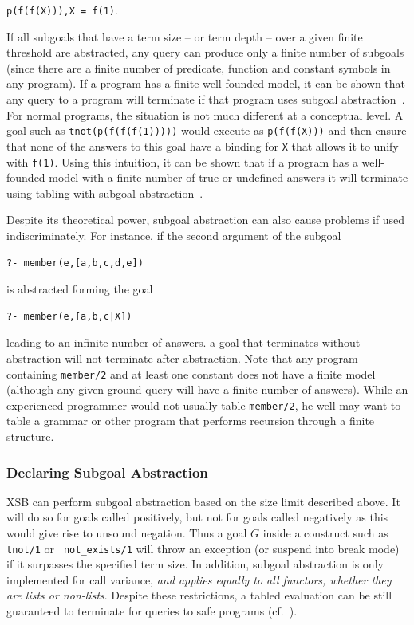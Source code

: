 {\tt p(f(f(X))),X = f(1)}.  

\noindent
If all subgoals that have a term size -- or term depth -- over a given
finite threshold are abstracted, any query can produce only a finite
number of subgoals (since there are a finite number of predicate,
function and constant symbols in any program). If a program has a
finite well-founded model, it can be shown that any query to a program
will terminate if that program uses subgoal abstraction~\cite{RigS14}.
%
For normal programs, the situation is not much different at a
conceptual level.  A goal such as {\tt tnot(p(f(f(f(1)))))} would
execute as {\tt p(f(f(X)))} and then ensure that none of the answers
to this goal have a binding for {\tt X} that allows it to unify with
{\tt f(1)}.  Using this intuition, it can be shown that if a program
has a well-founded model with a finite number of true or undefined
answers it will terminate using tabling with subgoal
abstraction~\cite{RigS13,RigS14}.

Despite its theoretical power, subgoal abstraction can also cause
problems if used indiscriminately.  For instance, if the second
argument of the subgoal
%
\begin{verbatim}
?- member(e,[a,b,c,d,e])
\end{verbatim}
%
is abstracted forming the goal
%
\begin{verbatim}
?- member(e,[a,b,c|X])
\end{verbatim}
%
leading to an infinite number of answers.  a goal that terminates
without abstraction will not terminate after abstraction.  Note that
any program containing {\tt member/2} and at least one constant does
not have a finite model (although any given ground query will have a
finite number of answers).  While an experienced programmer would not
usually table {\tt member/2}, he well may want to table a grammar or
other program that performs recursion through a finite structure.

\subsubsection{Declaring Subgoal Abstraction}
%

XSB can perform subgoal abstraction based on the size limit described
above.  It will do so for goals called positively, but not for goals
called negatively as this would give rise to unsound negation.  Thus a
goal $G$ inside a construct such as {\tt tnot/1} or {\tt
  not\_exists/1} will throw an exception (or suspend into break mode)
if it surpasses the specified term size. In addition, subgoal
abstraction is only implemented for call variance, {\em and applies
  equally to all functors, whether they are lists or non-lists}.
Despite these restrictions, a tabled evaluation can be still
guaranteed to terminate for queries to safe programs
(cf.~\cite{RigS13}).

